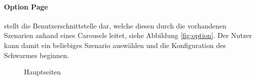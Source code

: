 \paragraph{Option Page} stellt die Benutzerschnittstelle dar, welche diesen durch die vorhandenen Szenarien anhand eines Carousels leitet, siehe Abbildung \eqref{fig:option}. Der Nutzer kann damit ein beliebiges Szenario auswählen und die Konfiguration des Schwarmes beginnen.\\

\bigskip

\begin{figure}[h]
	\centering
	\qquad
	\caption{Hauptseiten}
\end{figure}

